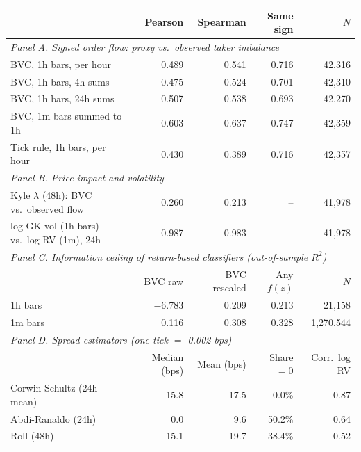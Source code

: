 \begin{tabular}{lrrrr}
\toprule
 & Pearson & Spearman & Same sign & $N$\\
\midrule
\multicolumn{5}{l}{\emph{Panel A. Signed order flow: proxy vs.\ observed taker imbalance}}\\
BVC, 1h bars, per hour & 0.489 & 0.541 & 0.716 & 42,316\\
BVC, 1h bars, 4h sums & 0.475 & 0.524 & 0.701 & 42,310\\
BVC, 1h bars, 24h sums & 0.507 & 0.538 & 0.693 & 42,270\\
BVC, 1m bars summed to 1h & 0.603 & 0.637 & 0.747 & 42,359\\
Tick rule, 1h bars, per hour & 0.430 & 0.389 & 0.716 & 42,357\\
\midrule
\multicolumn{5}{l}{\emph{Panel B. Price impact and volatility}}\\
Kyle $\lambda$ (48h): BVC vs.\ observed flow & 0.260 & 0.213 & -- & 41,978\\
log GK vol (1h bars) vs.\ log RV (1m), 24h & 0.987 & 0.983 & -- & 41,978\\
\midrule
\multicolumn{5}{l}{\emph{Panel C. Information ceiling of return-based classifiers (out-of-sample $R^2$)}}\\
 & BVC raw & BVC rescaled & Any $f(z)$ & $N$\\
1h bars & \ensuremath{-}6.783 & 0.209 & 0.213 & 21,158\\
1m bars & 0.116 & 0.308 & 0.328 & 1,270,544\\
\midrule
\multicolumn{5}{l}{\emph{Panel D. Spread estimators (one tick $=$ 0.002 bps)}}\\
 & Median (bps) & Mean (bps) & Share $=0$ & Corr.\ log RV\\
Corwin-Schultz (24h mean) & 15.8 & 17.5 & 0.0\% & 0.87\\
Abdi-Ranaldo (24h) & 0.0 & 9.6 & 50.2\% & 0.64\\
Roll (48h) & 15.1 & 19.7 & 38.4\% & 0.52\\
\bottomrule
\end{tabular}
